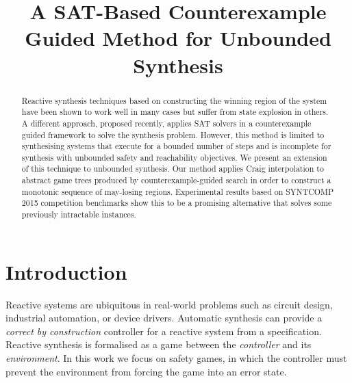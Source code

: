 \documentclass{llncs}
\begin{document}
\title{A SAT-Based Counterexample Guided Method for Unbounded Synthesis}

\author{}
\institute{}

%

\maketitle

\sloppy

\begin{abstract}

    Reactive synthesis techniques based on constructing the winning region of
    the system have been shown to work well in many cases but suffer from state
    explosion in others.  A different approach, proposed recently, applies SAT
    solvers in a counterexample guided framework to solve the synthesis
    problem.  However, this method is limited to synthesising systems that
    execute for a bounded number of steps and is incomplete for synthesis with
    unbounded safety and reachability objectives.  We present an extension of
    this technique to unbounded synthesis.  Our method applies Craig
    interpolation to abstract game trees produced by counterexample-guided
    search in order to construct a monotonic sequence of may-losing regions.
    Experimental results based on SYNTCOMP 2015 competition benchmarks show
    this to be a promising alternative that solves some previously intractable
    instances.

\end{abstract}

\section{Introduction}

Reactive systems are ubiquitous in real-world problems such as circuit design,
industrial automation, or device drivers. Automatic synthesis can provide a
\emph{correct by construction} controller for a reactive system from a
specification.  Reactive synthesis is formalised as a game between the \emph{controller} and
its \emph{environment}. In this work we focus on safety games, in which the
controller must prevent the environment from forcing the game into an error
state.
\end{document}
